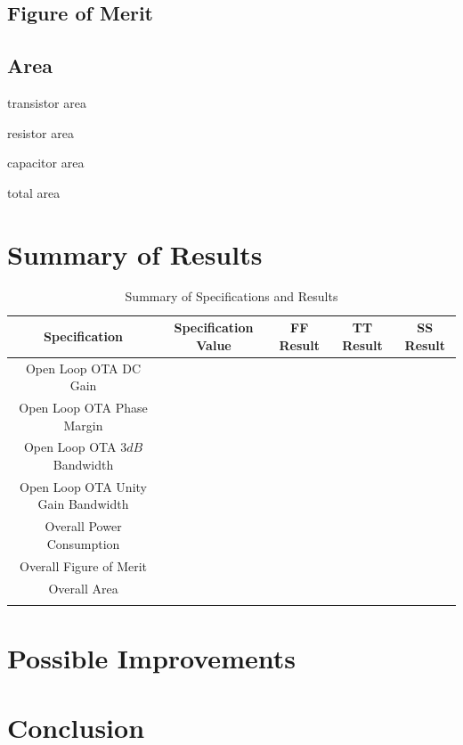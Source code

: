 \documentclass[journal]{IEEEtran}
\begin{document}
\subsection{Figure of Merit}

\subsection{Area}
transistor area

resistor area

capacitor area

total area

\section{Summary of Results}

\begin{table}
\centering
\caption{Summary of Specifications and Results}
\label{tab:specs_results}
\begin{tabular}{|c|c|c|c|c|}
\hline Specification & Specification Value & FF Result & TT Result & SS Result\\ 
\hline Open Loop OTA DC Gain &  & &  & \\ 
\hline Open Loop OTA Phase Margin &  & &  & \\ 
\hline Open Loop OTA $3dB$ Bandwidth &  & &  & \\ 
\hline Open Loop OTA Unity Gain Bandwidth &  & &  & \\ 
\hline Overall Power Consumption &  & &  & \\ 
\hline Overall Figure of Merit &  & &  & \\ 
\hline Overall Area &  & &  & \\ 
\hline  &  & &  & \\ 
\hline 
\end{tabular} 
\end{table}


\section{Possible Improvements}

\section{Conclusion}


\end{document}
